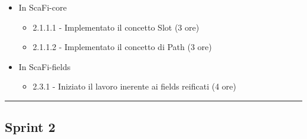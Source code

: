 \documentclass[12pt, a4paper]{article}
\begin{document}
\begin{itemize}
\begin{itemize}
                    \color{cyan}
              \item In ScaFi-core
                    \begin{itemize}
                        \item 2.1.1.1 - Implementato il concetto Slot (3 ore)
                        \item 2.1.1.2 - Implementato il concetto di Path (3 ore)
                    \end{itemize}
                    \color{blue}
              \item In ScaFi-fields
                    \begin{itemize}
                        \item 2.3.1 - Iniziato il lavoro inerente ai fields reificati (4 ore)
                    \end{itemize}
          \end{itemize}
\end{itemize}

\par\noindent\rule{\textwidth}{0.5pt}

\subsection*{Sprint 2}
\end{document}
